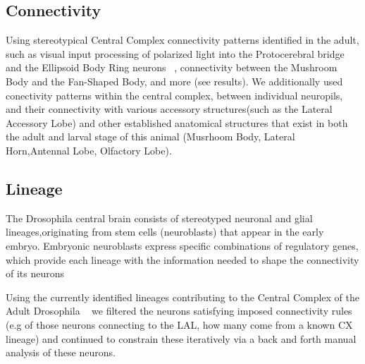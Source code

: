 \documentclass{article}
\begin{document}
 
 
 
 \subsection{Connectivity}
    Using stereotypical Central Complex connectivity patterns identified in the adult, such as visual input processing  of polarized light into the Protocerebral bridge and the Ellipsoid Body Ring neurons ~\citep
    {hardcastle2021visual, lin2013comprehensive, hulse2021connectome}, connectivity between the Mushroom Body and the Fan-Shaped Body, and more (see results). 
    We additionally used conectivity patterns within the central complex, between individual neuropils, and their connectivity with various accessory structures(such as the Lateral Accessory Lobe) and other established anatomical structures that exist in both the adult and larval stage of this animal (Musrhoom Body, Lateral Horn,Antennal Lobe, Olfactory Lobe).

 \subsection{Lineage}
 The Drosophila central brain consists of stereotyped neuronal and glial lineages,originating from stem cells (neuroblasts) that appear in the early embryo. 
 Embryonic neuroblasts express specific combinations of regulatory genes, which provide each lineage with the information needed to shape the connectivity of its neurons 

 
 Using the currently identified lineages contributing to the Central Complex of the Adult Drosophila ~\citep{andrade2019developmentally}%
 we filtered the neurons satisfying imposed connectivity rules (e.g of those neurons connecting to the LAL, how many come from a known CX lineage) and continued to constrain these iteratively via a back and forth manual analysis of these neurons. 
\end{document}
